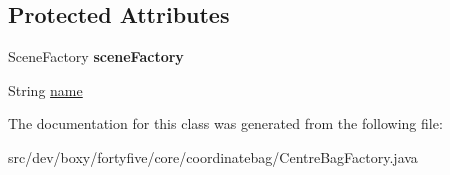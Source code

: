 \subsection*{Protected Attributes}
\begin{DoxyCompactItemize}
\item 
\hypertarget{classdev_1_1boxy_1_1fortyfive_1_1core_1_1coordinatebag_1_1_centre_bag_factory_a02819735da83f2c593da0060b5ad0fcb}{
SceneFactory {\bfseries sceneFactory}}
\label{d8/dc6/classdev_1_1boxy_1_1fortyfive_1_1core_1_1coordinatebag_1_1_centre_bag_factory_a02819735da83f2c593da0060b5ad0fcb}

\item 
String \hyperlink{group___centre_bag_ga9cb08e2f0852934e3886db043c9b314b}{name}
\end{DoxyCompactItemize}


The documentation for this class was generated from the following file:\begin{DoxyCompactItemize}
\item 
src/dev/boxy/fortyfive/core/coordinatebag/CentreBagFactory.java\end{DoxyCompactItemize}
